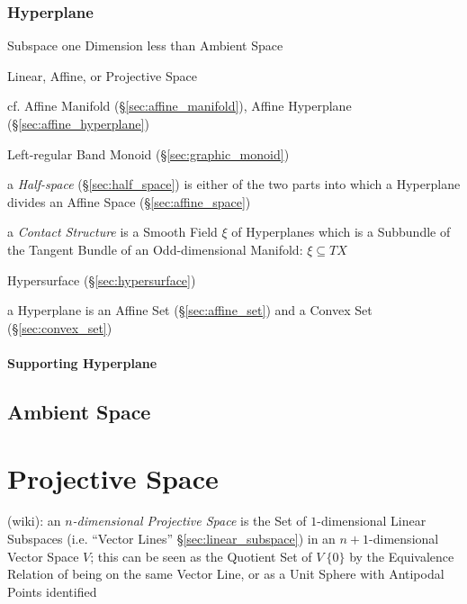 \subsubsection{Hyperplane}\label{sec:hyperplane}

Subspace one Dimension less than Ambient Space

Linear, Affine, or Projective Space %

cf. Affine Manifold (\S\ref{sec:affine_manifold}), Affine Hyperplane
(\S\ref{sec:affine_hyperplane})

Left-regular Band Monoid (\S\ref{sec:graphic_monoid})

a \emph{Half-space} (\S\ref{sec:half_space}) is either of the two parts into
which a Hyperplane divides an Affine Space (\S\ref{sec:affine_space})

a \emph{Contact Structure} is a Smooth Field $\xi$ of Hyperplanes which is a
Subbundle of the Tangent Bundle of an Odd-dimensional Manifold: $\xi \subseteq
T X$

\fist Hypersurface (\S\ref{sec:hypersurface})

a Hyperplane is an Affine Set (\S\ref{sec:affine_set}) and a Convex Set
(\S\ref{sec:convex_set})



\paragraph{Supporting Hyperplane}\label{sec:supporting_hyperplane}\hfill



\subsection{Ambient Space}\label{sec:ambient_space}




\section{Projective Space}\label{sec:projective_space}

(wiki):
an \emph{$n$-dimensional Projective Space} is the Set of $1$-dimensional Linear
Subspaces (i.e. ``Vector Lines'' \S\ref{sec:linear_subspace}) in an
$n+1$-dimensional Vector Space $V$; this can be seen as the Quotient Set of $V
\ \{0\}$ by the Equivalence Relation of being on the same Vector Line, or as a
Unit Sphere with Antipodal Points identified

